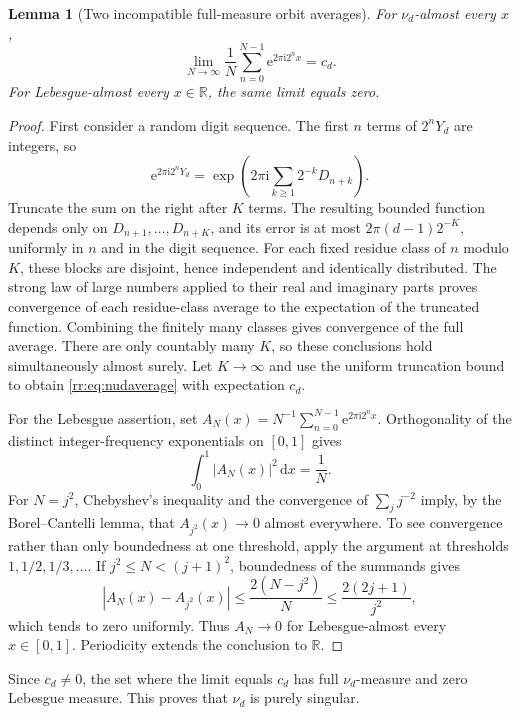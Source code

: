 \documentclass[11pt,a4paper,oneside,openany]{book}
\numberwithin{equation}{chapter}
\newtheorem{lemma}[theorem]{Lemma}
\theoremstyle{definition}
\theoremstyle{remark}
\newcommand{\R}{\mathbb R}
\newcommand{\dd}{\,\mathrm d}
\newcommand{\e}{\mathrm e}
\newcommand{\ii}{\mathrm i}
\begin{document}
\begin{lemma}[Two incompatible full-measure orbit averages]
For \(\nu_d\)-almost every \(x\),
\begin{equation}
 \lim_{N\to\infty}\frac1N\sum_{n=0}^{N-1}\e^{2\pi\ii2^nx}=c_d.
 \label{rr:eq:nudaverage}
\end{equation}
For Lebesgue-almost every \(x\in\R\), the same limit equals zero.
\end{lemma}
\begin{proof}
First consider a random digit sequence. The first \(n\) terms of \(2^nY_d\) are integers, so
\[
 \e^{2\pi\ii2^nY_d}
 =\exp\left(2\pi\ii\sum_{k\geq1}2^{-k}D_{n+k}\right).
\]
Truncate the sum on the right after \(K\) terms. The resulting bounded function depends only on \(D_{n+1},\ldots,D_{n+K}\), and its error is at most \(2\pi(d-1)2^{-K}\), uniformly in \(n\) and in the digit sequence. For each fixed residue class of \(n\) modulo \(K\), these blocks are disjoint, hence independent and identically distributed. The strong law of large numbers applied to their real and imaginary parts proves convergence of each residue-class average to the expectation of the truncated function. Combining the finitely many classes gives convergence of the full average. There are only countably many \(K\), so these conclusions hold simultaneously almost surely. Let \(K\to\infty\) and use the uniform truncation bound to obtain \eqref{rr:eq:nudaverage} with expectation \(c_d\).

For the Lebesgue assertion, set
\(A_N(x)=N^{-1}\sum_{n=0}^{N-1}\e^{2\pi\ii2^nx}\).
Orthogonality of the distinct integer-frequency exponentials on \([0,1]\) gives
\[
 \int_0^1|A_N(x)|^2\dd x=\frac1N.
\]
For \(N=j^2\), Chebyshev's inequality and the convergence of \(\sum_jj^{-2}\) imply, by the Borel--Cantelli lemma, that \(A_{j^2}(x)\to0\) almost everywhere. To see convergence rather than only boundedness at one threshold, apply the argument at thresholds \(1,1/2,1/3,\ldots\). If \(j^2\leq N<(j+1)^2\), boundedness of the summands gives
\[
 |A_N(x)-A_{j^2}(x)|\leq\frac{2(N-j^2)}N\leq\frac{2(2j+1)}{j^2},
\]
which tends to zero uniformly. Thus \(A_N\to0\) for Lebesgue-almost every \(x\in[0,1]\). Periodicity extends the conclusion to \(\R\).
\end{proof}

Since \(c_d\ne0\), the set where the limit equals \(c_d\) has full \(\nu_d\)-measure and zero Lebesgue measure. This proves that \(\nu_d\) is purely singular.
\end{document}
